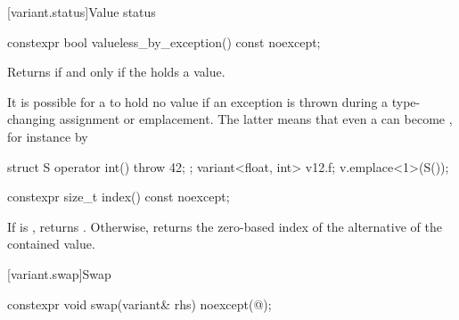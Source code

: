 [variant.status]{Value status}

%
\begin{itemdecl}
constexpr bool valueless_by_exception() const noexcept;
\end{itemdecl}

\begin{itemdescr}
\pnum
\effects
Returns  if and only if the  holds a value.

\pnum
\begin{note}
It is possible for a  to hold no value
if an exception is thrown during a
type-changing assignment or emplacement. The latter means that even a
 can become , for
instance by
\begin{codeblock}
struct S { operator int() { throw 42; }};
variant<float, int> v{12.f};
v.emplace<1>(S());
\end{codeblock}
\end{note}
\end{itemdescr}

%
\begin{itemdecl}
constexpr size_t index() const noexcept;
\end{itemdecl}

\begin{itemdescr}
\pnum
\effects
If  is , returns .
Otherwise, returns the zero-based index of the alternative of the contained value.
\end{itemdescr}

[variant.swap]{Swap}

%
\begin{itemdecl}
constexpr void swap(variant& rhs) noexcept(@\seebelow@);
\end{itemdecl}

